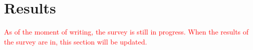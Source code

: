 
\section{Results}

\textcolor{red}{%
    As of the moment of writing, the survey is still in progress.
    When the results of the survey are in, this section will be updated.%
    }